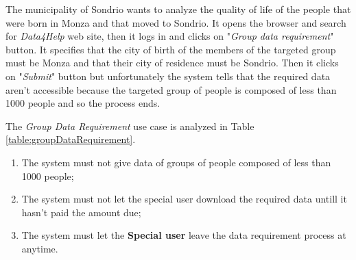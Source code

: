 The municipality of Sondrio wants to analyze the quality of life of the people that were born in Monza and that moved to Sondrio.  It opens the browser and search for \textit{Data4Help} web site, then it logs in and clicks on "\textit{Group data requirement}" button. It specifies that the city of birth of the members of the targeted group must be Monza and that their city of residence must be Sondrio. Then it clicks on "\textit{Submit}" button but unfortunately the system tells that the required data aren't accessible because the targeted group of people is composed of less than 1000 people and so the process ends.

The \textit{Group Data Requirement} use case is analyzed in Table \ref{table:groupDataRequirement}.

\begin{enumerate}
  \item The system must not give data of groups of people composed of less than 1000 people;
  \item The system must not let the special user download the required data untill it hasn't paid the amount due;
  \item The system must let the \textbf{Special user} leave the data requirement process at anytime.
\end{enumerate}


